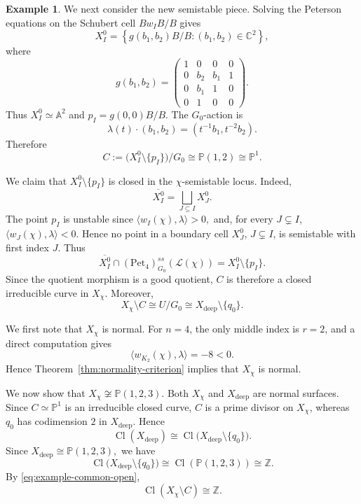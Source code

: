 \documentclass[12pt, reqno]{amsart}
\theoremstyle{plain}
\numberwithin{equation}{section}
\theoremstyle{definition}
\newtheorem{example}{Example}
\begin{document}
\begin{example}
We next consider the new semistable piece. Solving the Peterson
equations on the Schubert cell \(Bw_IB/B\) gives
\[
X_I^0
=
\left\{
g(b_1,b_2)B/B:
(b_1,b_2)\in\mathbb C^2
\right\},
\]
where
\[
g(b_1,b_2)
=
\begin{pmatrix}
1&0&0&0\\
0&b_2&b_1&1\\
0&b_1&1&0\\
0&1&0&0
\end{pmatrix}.
\]
Thus $X_I^0\simeq\mathbb A^2$ and $p_I=g(0,0)B/B.$
The \(G_0\)-action is
\[
\lambda(t)\cdot(b_1,b_2)
=
(t^{-1}b_1,t^{-2}b_2).
\]
Therefore
\[
C
:=
\bigl(X_I^0\setminus\{p_I\}\bigr)/G_0
\cong
\mathbb P(1,2)
\cong
\mathbb P^1.
\]

We claim that \(X_I^0\setminus\{p_I\}\) is closed in the
\(\chi\)-semistable locus. Indeed,
\[
\overline{X_I^0}
=
\bigsqcup_{J\subseteq I}X_J^0.
\]
The point \(p_I\) is unstable since $\langle w_I(\chi),\lambda\rangle>0,$ and, for every \(J\subsetneq I\), $
\langle w_J(\chi),\lambda\rangle<0.$
Hence no point in a boundary cell \(X_J^0\), \(J\subsetneq I\), is
semistable with first index \(J\). Thus
\[
\overline{X_I^0}\cap
(\mathrm{Pet}_4)^{ss}_{G_0}(\mathcal L(\chi))
=
X_I^0\setminus\{p_I\}.
\]
Since the quotient morphism is a good quotient, \(C\) is therefore a
closed irreducible curve in \(X_\chi\). Moreover,
\begin{equation}\label{eq:example-common-open}
X_\chi\setminus C
\cong
U/G_0
\cong
X_{\mathrm{deep}}\setminus\{q_0\}.
\end{equation}

We first note that \(X_\chi\) is normal. For \(n=4\), the only middle
index is \(r=2\), and a direct computation gives
\[
\langle w_{K_2}(\chi),\lambda\rangle=-8<0.
\]
Hence Theorem~\ref{thm:normality-criterion} implies that \(X_\chi\)
is normal.

We now show that $X_\chi\not\cong\mathbb P(1,2,3).$
Both \(X_\chi\) and \(X_{\mathrm{deep}}\) are normal surfaces.
Since \(C\simeq\mathbb P^1\) is an irreducible closed curve,
\(C\) is a prime divisor on \(X_\chi\), whereas \(q_0\) has
codimension \(2\) in \(X_{\mathrm{deep}}\). Hence
\[
\operatorname{Cl}(X_{\mathrm{deep}})
\cong
\operatorname{Cl}
\bigl(X_{\mathrm{deep}}\setminus\{q_0\}\bigr).
\]
Since $X_{\mathrm{deep}}\cong\mathbb P(1,2,3),$ we have
\[
\operatorname{Cl}
\bigl(X_{\mathrm{deep}}\setminus\{q_0\}\bigr)
\cong
\operatorname{Cl}(\mathbb P(1,2,3))
\cong\mathbb Z.
\]
By \eqref{eq:example-common-open},
\[
\operatorname{Cl}(X_\chi\setminus C)\cong\mathbb Z.
\]


\end{example}
\end{document}
